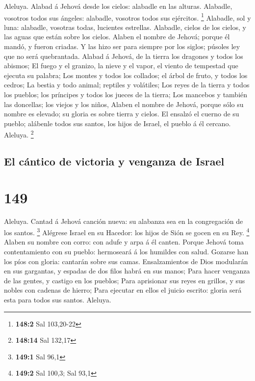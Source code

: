 Aleluya. Alabad á Jehová desde los cielos: alabadle en las
alturas.  Alabadle, vosotros todos sus ángeles: alabadle,
vosotros todos sus ejércitos. \footnote{\textbf{148:2} Sal 103,20-22}
 Alabadle, sol y luna: alabadle, vosotras todas, lucientes
estrellas.  Alabadle, cielos de los cielos, y las aguas que
están sobre los cielos.  Alaben el nombre de Jehová; porque
él mandó, y fueron criadas.  Y las hizo ser para siempre por
los siglos; púsoles ley que no será quebrantada.  Alabad á
Jehová, de la tierra los dragones y todos los abismos;  El
fuego y el granizo, la nieve y el vapor, el viento de tempestad que
ejecuta su palabra;  Los montes y todos los collados; el
árbol de fruto, y todos los cedros;  La bestia y todo
animal; reptiles y volátiles;  Los reyes de la tierra y
todos los pueblos; los príncipes y todos los jueces de la tierra;
 Los mancebos y también las doncellas; los viejos y los
niños,  Alaben el nombre de Jehová, porque sólo su nombre
es elevado; su gloria es sobre tierra y cielos.  El ensalzó
el cuerno de su pueblo; alábenle todos sus santos, los hijos de Israel,
el pueblo á él cercano. Aleluya. \footnote{\textbf{148:14} Sal 132,17}

\hypertarget{el-cuxe1ntico-de-victoria-y-venganza-de-israel}{%
\subsection{El cántico de victoria y venganza de
Israel}\label{el-cuxe1ntico-de-victoria-y-venganza-de-israel}}

\hypertarget{section-148}{%
\section{149}\label{section-148}}

 Aleluya. Cantad á Jehová canción nueva: su alabanza sea en
la congregación de los santos. \footnote{\textbf{149:1} Sal 96,1}
 Alégrese Israel en su Hacedor: los hijos de Sión se gocen
en su Rey. \footnote{\textbf{149:2} Sal 100,3; Sal 93,1} 
Alaben su nombre con corro: con adufe y arpa á él canten. 
Porque Jehová toma contentamiento con su pueblo: hermoseará á los
humildes con salud.  Gozarse han los píos con gloria:
cantarán sobre sus camas.  Ensalzamientos de Dios modularán
en sus gargantas, y espadas de dos filos habrá en sus manos;
 Para hacer venganza de las gentes, y castigo en los
pueblos;  Para aprisionar sus reyes en grillos, y sus nobles
con cadenas de hierro;  Para ejecutar en ellos el juicio
escrito: gloria será esta para todos sus santos. Aleluya.

